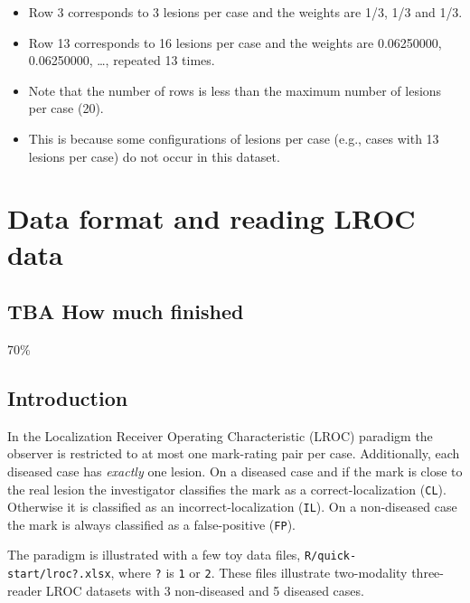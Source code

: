 \documentclass[
]{book}
\providecommand{\tightlist}{%
  \setlength{\itemsep}{0pt}\setlength{\parskip}{0pt}}
\begin{document}
\begin{itemize}
\tightlist
\item
  Row 3 corresponds to 3 lesions per case and the weights are 1/3, 1/3 and 1/3.
\item
  Row 13 corresponds to 16 lesions per case and the weights are 0.06250000, 0.06250000, \ldots, repeated 13 times.
\item
  Note that the number of rows is less than the maximum number of lesions per case (20).
\item
  This is because some configurations of lesions per case (e.g., cases with 13 lesions per case) do not occur in this dataset.
\end{itemize}

\hypertarget{quick-start-lroc-data}{%
\chapter{Data format and reading LROC data}\label{quick-start-lroc-data}}

\hypertarget{quick-start-lroc-data-how-much-finished}{%
\section{TBA How much finished}\label{quick-start-lroc-data-how-much-finished}}

70\%

\hypertarget{quick-start-lroc-data-intro}{%
\section{Introduction}\label{quick-start-lroc-data-intro}}

In the Localization Receiver Operating Characteristic (LROC) paradigm \citep{starr1977comments, starr1975visual, swensson1996unified} the observer is restricted to at most one mark-rating pair per case. Additionally, each diseased case has \emph{exactly} one lesion. On a diseased case and if the mark is close to the real lesion the investigator classifies the mark as a correct-localization (\texttt{CL}). Otherwise it is classified as an incorrect-localization (\texttt{IL}). On a non-diseased case the mark is always classified as a false-positive (\texttt{FP}).

The paradigm is illustrated with a few toy data files, \texttt{R/quick-start/lroc?.xlsx}, where \texttt{?} is \texttt{1} or \texttt{2}. These files illustrate two-modality three-reader LROC datasets with 3 non-diseased and 5 diseased cases.
\end{document}
